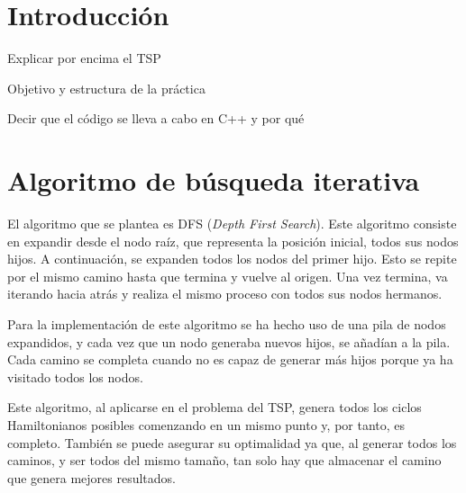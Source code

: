 \documentclass{uc3mpracticas}
\begin{document}
  \frontmatter



  \vspace{55mm}


  \newpage

  \tableofcontents

\newpage

  \mainmatter
  
  \section{Introducción}
  Explicar por encima el TSP
  
  Objetivo y estructura de la práctica
  
  Decir que el código se lleva a cabo en C++ y por qué

  \section{Algoritmo de búsqueda iterativa}

  El algoritmo que se plantea es DFS (\textit{Depth First Search}). Este algoritmo consiste en expandir desde el nodo raíz, que representa la posición inicial, todos sus nodos hijos. A continuación, se expanden todos los nodos del primer hijo. Esto se repite por el mismo camino hasta que termina y vuelve al origen. Una vez termina, va iterando hacia atrás y realiza el mismo proceso con todos sus nodos hermanos.

  \vspace{2mm}

  Para la implementación de este algoritmo se ha hecho uso de una pila de nodos expandidos, y cada vez que un nodo generaba nuevos hijos, se añadían a la pila. Cada camino se completa cuando no es capaz de generar más hijos porque ya ha visitado todos los nodos.

  \vspace{2mm}

  Este algoritmo, al aplicarse en el problema del TSP, genera todos los ciclos Hamiltonianos posibles comenzando en un mismo punto y, por tanto, es completo. También se puede asegurar su optimalidad ya que, al generar todos los caminos, y ser todos del mismo tamaño, tan solo hay que almacenar el camino que genera mejores resultados.
\end{document}
